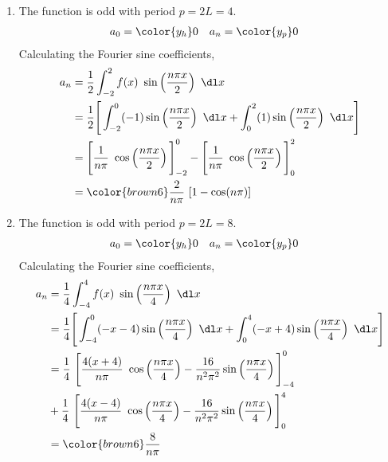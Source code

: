 \begin{enumerate}
    \item The function is odd with period $ p = 2L = 4 $.
          \begin{align}
              a_0 & = \color{y_h} 0 &
              a_n & = \color{y_p} 0
          \end{align}
          Calculating the Fourier sine coefficients,
          \begin{align}
              a_n & = \frac{1}{2} \int_{-2}^{2} f(x)\ \sin\left( \frac{n\pi x }{2}
              \right)\ \dl x                                                           \\
                  & = \frac{1}{2} \Bigg[\int_{-2}^{0} (-1) \sin\left( \frac{n\pi x}{2}
                  \right)\ \dl x
              + \int_{0}^{2} (1) \sin\left( \frac{n\pi x }{2} \right)\ \dl x \Bigg]    \\
                  & = \Bigg[ \frac{1}{n\pi}\ \cos\left( \frac{n\pi x}{2}
                  \right) \Bigg]_{-2}^{0}
              - \Bigg[ \frac{1}{n\pi}\ \cos\left( \frac{n\pi x}{2}
              \right) \Bigg]_{0}^{2}                                                   \\
                  & = \color{brown6} \frac{2}{n\pi}\ [1 - \cos(n\pi)]
          \end{align}

    \item The function is odd with period $ p = 2L = 8 $.
          \begin{align}
              a_0 & = \color{y_h} 0 &
              a_n & = \color{y_p} 0
          \end{align}
          Calculating the Fourier sine coefficients,
          \begin{align}
              a_n & = \frac{1}{4} \int_{-4}^{4} f(x)\ \sin\left( \frac{n\pi x}{4}
              \right)\ \dl x                                                           \\
                  & = \frac{1}{4} \Bigg[
                  \int_{-4}^{0} (-x-4) \sin\left( \frac{n\pi x}{4} \right)\ \dl x
              + \int_{0}^{4} (-x+4) \sin\left( \frac{n\pi x }{4} \right)\ \dl x \Bigg] \\
                  & = \frac{1}{4}\ \Bigg[ \frac{4(x+4)}{n\pi}\
                  \cos\left(\frac{n\pi x}{4}\right) - \frac{16}{n^2 \pi^2}
              \sin\left( \frac{n\pi x}{4} \right) \Bigg]_{-4}^{0}                      \\
                  & + \frac{1}{4}\ \Bigg[ \frac{4(x-4)}{n\pi}\
                  \cos\left(\frac{n\pi x}{4}\right) - \frac{16}{n^2 \pi^2}
              \sin\left( \frac{n\pi x}{4} \right) \Bigg]_{0}^{4}                       \\
                  & = \color{brown6} \frac{8}{n\pi}
          \end{align}


\end{enumerate}
